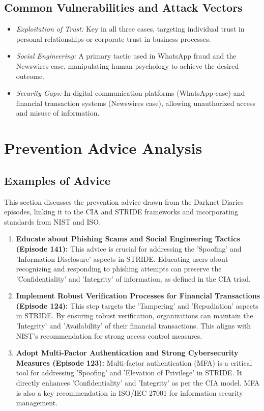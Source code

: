 \documentclass[11pt]{article}
\begin{document}
\subsection{Common Vulnerabilities and Attack Vectors}
\begin{itemize}
    \item \textit{Exploitation of Trust:} Key in all three cases, targeting individual trust in personal relationships or corporate trust in business processes.    
    \item \textit{Social Engineering:} A primary tactic used in WhatsApp fraud and the Newswires case, manipulating human psychology to achieve the desired outcome.
    \item \textit{Security Gaps:} In digital communication platforms (WhatsApp case) and financial transaction systems (Newswires case), allowing unauthorized access and misuse of information.
\end{itemize}

\section{Prevention Advice Analysis}

\subsection{Examples of Advice}
This section discusses the prevention advice drawn from the Darknet Diaries episodes, linking it to the CIA and STRIDE frameworks and incorporating standards from NIST and ISO.

\begin{enumerate}
    \item \textbf{Educate about Phishing Scams and Social Engineering Tactics (Episode 141):} This advice is crucial for addressing the 'Spoofing' and 'Information Disclosure' aspects in STRIDE. Educating users about recognizing and responding to phishing attempts can preserve the 'Confidentiality' and 'Integrity' of information, as defined in the CIA triad.
    \item \textbf{Implement Robust Verification Processes for Financial Transactions (Episode 124):} This step targets the 'Tampering' and 'Repudiation' aspects in STRIDE. By ensuring robust verification, organizations can maintain the 'Integrity' and 'Availability' of their financial transactions. This aligns with NIST's recommendation for strong access control measures.
    \item \textbf{Adopt Multi-Factor Authentication and Strong Cybersecurity Measures (Episode 123):} Multi-factor authentication (MFA) is a critical tool for addressing 'Spoofing' and 'Elevation of Privilege' in STRIDE. It directly enhances 'Confidentiality' and 'Integrity' as per the CIA model. MFA is also a key recommendation in ISO/IEC 27001 for information security management.
\end{enumerate}
\end{document}
